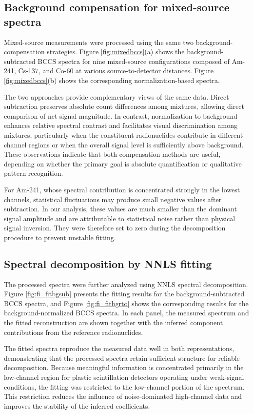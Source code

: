 \documentclass[pdflatex,sn-mathphys-num, table]{sn-jnl}%
\theoremstyle{thmstyleone}%
\theoremstyle{thmstyletwo}%
\theoremstyle{thmstylethree}%
\begin{document}
\subsection*{Background compensation for mixed-source spectra}

Mixed-source measurements were processed using the same two background-compensation strategies. Figure \ref{fig:mixedbccs}(a) shows the background-subtracted BCCS spectra for nine mixed-source configurations composed of Am-241, Cs-137, and Co-60 at various source-to-detector distances. Figure \ref{fig:mixedbccs}(b) shows the corresponding normalization-based spectra.

The two approaches provide complementary views of the same data. Direct subtraction preserves absolute count differences among mixtures, allowing direct comparison of net signal magnitude. In contrast, normalization to background enhances relative spectral contrast and facilitates visual discrimination among mixtures, particularly when the constituent radionuclides contribute in different channel regions or when the overall signal level is sufficiently above background. These observations indicate that both compensation methods are useful, depending on whether the primary goal is absolute quantification or qualitative pattern recognition.

For Am-241, whose spectral contribution is concentrated strongly in the lowest channels, statistical fluctuations may produce small negative values after subtraction. In our analysis, these values are much smaller than the dominant signal amplitude and are attributable to statistical noise rather than physical signal inversion. They were therefore set to zero during the decomposition procedure to prevent unstable fitting.


\subsection*{Spectral decomposition by NNLS fitting}

The processed spectra were further analyzed using NNLS spectral decomposition. Figure \ref{fig:fi_fitbgsub} presents the fitting results for the background-subtracted BCCS spectra, and Figure \ref{fig:fi_fitbgrto} shows the corresponding results for the background-normalized BCCS
spectra. In each panel, the measured spectrum and the fitted reconstruction are shown together with the inferred component contributions from the reference radionuclides.

The fitted spectra reproduce the measured data well in both representations, demonstrating that the processed spectra retain sufficient structure for reliable decomposition. Because meaningful information is concentrated primarily in the low-channel region for plastic scintillation detectors operating under weak-signal conditions, the fitting was restricted to the low-channel portion of the spectrum. This restriction reduces the influence of noise-dominated high-channel data and improves the stability of the inferred coefficients.
\end{document}
